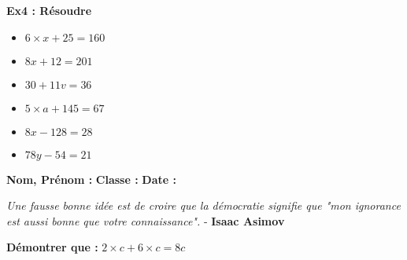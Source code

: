 \textbf{Ex4 : Résoudre} \vspace{-0.4cm}

\begin{multicols}{3}
\begin{itemize}[label={$\bullet$}]
  \item $6 \times x + 25 = 160$ 
  \item $8x + 12 = 201$ \columnbreak 
  \item $30 + 11v = 36$ 
  \item $5 \times a + 145 = 67$ \columnbreak 
  \item $8x - 128 = 28$ 
  \item $78y - 54 = 21$ 
\end{itemize}
\end{multicols}
\Pointilles[24]

\newpage
\textbf{Nom, Prénom :} \hspace{8cm} \textbf{Classe :} \hspace{3cm} \textbf{Date :}\\

\vspace{-0.8cm}

\begin{center}
  \textit{Une fausse bonne idée est de croire que la démocratie signifie que "mon ignorance est aussi bonne que votre connaissance".} - \textbf{Isaac Asimov}
\end{center}

\textbf{Démontrer que :} $2 \times c + 6 \times c = 8c$ \\ \Pointilles[4] 

\vspace{-0.6cm}

